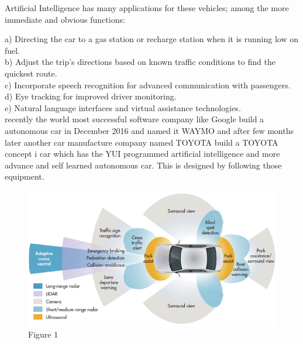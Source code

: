 \documentclass[conference]{IEEEtran}
\begin{document}
Artificial Intelligence has many applications for these vehicles; among the more immediate and obvious functions:

a) Directing the car to a gas station or recharge station when it is running low on fuel.\\
b) Adjust the trip’s directions based on known traffic conditions to find the quickest route.\\
c) Incorporate speech recognition for advanced communication with passengers.\\
d) Eye tracking for improved driver monitoring.\\
e) Natural language interfaces and virtual assistance technologies.\\

recently the world most successful software company like Google build a autonomous car in December 2016 and named it WAYMO and after few months later another car manufacture company named TOYOTA build a TOYOTA concept i car which has the YUI programmed artificial intelligence and more advance and self learned autonomous car. This is designed by following those equipment.
\begin{figure}[!t]
\centering
\includegraphics[scale=0.4]{car.png}
\caption{Figure 1}
\label{fig_sim}
\end{figure}
\end{document}
